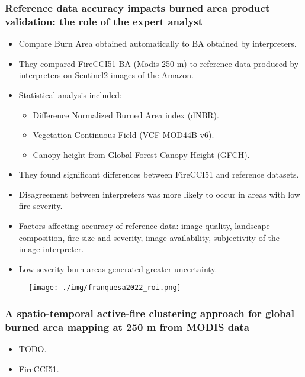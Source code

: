 \documentclass{beamer}
\begin{document}
\begin{frame}[t, allowframebreaks]
    \frametitle{Reference data accuracy impacts burned area product validation:
    the role of the expert analyst~\cite{franquesa2022}}
    \begin{itemize}
        \item Compare Burn Area obtained automatically to BA obtained by 
            interpreters.
        \item They compared FireCCI51 BA (Modis 250 m) to reference data 
            produced by interpreters on Sentinel2 images of the Amazon.
        \item Statistical analysis included:
            \begin{itemize}
                \item Difference Normalized Burned Area index (dNBR).
                \item Vegetation Continuous Field (VCF MOD44B v6).
                \item Canopy height from Global Forest Canopy Height (GFCH).
            \end{itemize}
        \item They found significant differences between FireCCI51 and 
            reference datasets.
        \item Disagreement between interpreters was more likely to occur in
            areas with low fire severity.
        \item Factors affecting accuracy of reference data: image quality,
            landscape composition, fire size and severity, image availability,
            subjectivity of the image interpreter.
        \item Low-severity burn areas generated greater uncertainty.
    \end{itemize}
    \begin{figure}
        \centering
        \texttt{[image: ./img/franquesa2022\_roi.png]}
    \end{figure}
\end{frame}

\begin{frame}
    \frametitle{A spatio-temporal active-fire clustering approach for global
    burned area mapping at 250 m from MODIS data}
    \begin{itemize}
        \item TODO.
        \item FireCCI51.
    \end{itemize}
\end{frame}
\end{document}
